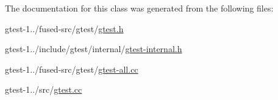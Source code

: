 \-The documentation for this class was generated from the following files\-:\begin{DoxyCompactItemize}
\item 
gtest-\/1../fused-\/src/gtest/\hyperlink{fused-src_2gtest_2gtest_8h}{gtest.\-h}\item 
gtest-\/1../include/gtest/internal/\hyperlink{gtest-internal_8h}{gtest-\/internal.\-h}\item 
gtest-\/1../fused-\/src/gtest/\hyperlink{fused-src_2gtest_2gtest-all_8cc}{gtest-\/all.\-cc}\item 
gtest-\/1../src/\hyperlink{gtest_8cc}{gtest.\-cc}\end{DoxyCompactItemize}
